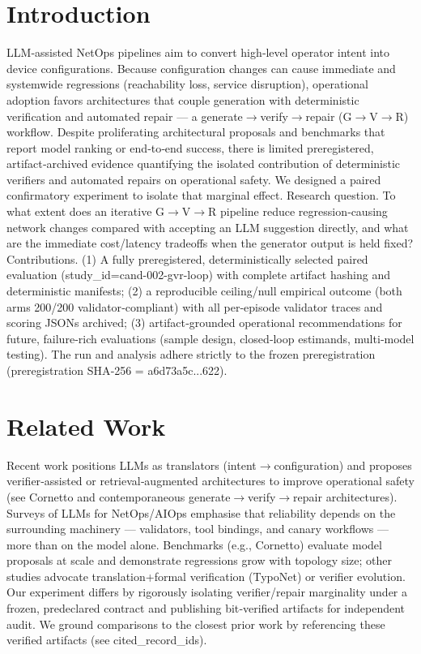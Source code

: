 \documentclass[conference]{IEEEtran}
\begin{document}
\section{Introduction}
LLM‑assisted NetOps pipelines aim to convert high‑level operator intent into device configurations. Because configuration changes can cause immediate and systemwide regressions (reachability loss, service disruption), operational adoption favors architectures that couple generation with deterministic verification and automated repair --- a generate\ensuremath{\rightarrow}verify\ensuremath{\rightarrow}repair (G\ensuremath{\rightarrow}V\ensuremath{\rightarrow}R) workflow. Despite proliferating architectural proposals and benchmarks that report model ranking or end‑to‑end success, there is limited preregistered, artifact‑archived evidence quantifying the isolated contribution of deterministic verifiers and automated repairs on operational safety. We designed a paired confirmatory experiment to isolate that marginal effect.
Research question. To what extent does an iterative G\ensuremath{\rightarrow}V\ensuremath{\rightarrow}R pipeline reduce regression‑causing network changes compared with accepting an LLM suggestion directly, and what are the immediate cost/latency tradeoffs when the generator output is held fixed?
Contributions. (1) A fully preregistered, deterministically selected paired evaluation (study\_id=cand-002-gvr-loop) with complete artifact hashing and deterministic manifests; (2) a reproducible ceiling/null empirical outcome (both arms 200/200 validator‑compliant) with all per‑episode validator traces and scoring JSONs archived; (3) artifact‑grounded operational recommendations for future, failure‑rich evaluations (sample design, closed‑loop estimands, multi‑model testing). The run and analysis adhere strictly to the frozen preregistration (preregistration SHA‑256 = a6d73a5c...622).

\section{Related Work}
Recent work positions LLMs as translators (intent\ensuremath{\rightarrow}configuration) and proposes verifier‑assisted or retrieval‑augmented architectures to improve operational safety (see Cornetto and contemporaneous generate\ensuremath{\rightarrow}verify\ensuremath{\rightarrow}repair architectures). Surveys of LLMs for NetOps/AIOps emphasise that reliability depends on the surrounding machinery --- validators, tool bindings, and canary workflows --- more than on the model alone. Benchmarks (e.g., Cornetto) evaluate model proposals at scale and demonstrate regressions grow with topology size; other studies advocate translation+formal verification (TypoNet) or verifier evolution. Our experiment differs by rigorously isolating verifier/repair marginality under a frozen, predeclared contract and publishing bit‑verified artifacts for independent audit. We ground comparisons to the closest prior work by referencing these verified artifacts (see cited\_record\_ids).
\end{document}
